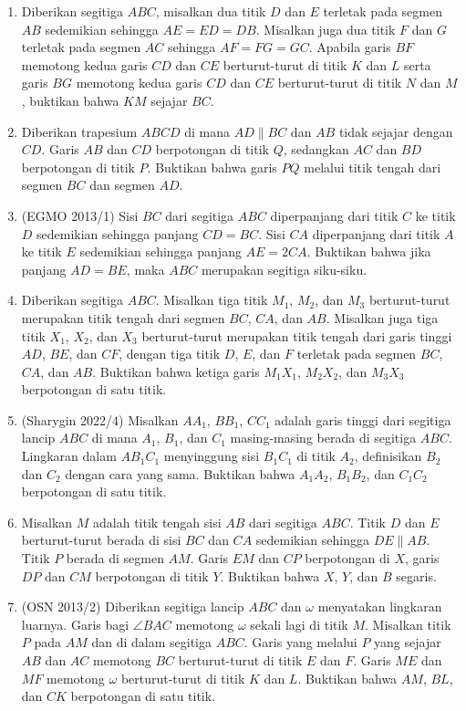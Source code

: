 \documentclass[a4paper, 11pt]{article}
\begin{document}
\begin{enumerate}
\item Diberikan segitiga $ABC$, misalkan dua titik $D$ dan $E$ terletak pada segmen $AB$ sedemikian sehingga $AE=ED=DB$. Misalkan juga dua titik $F$ dan $G$ terletak pada segmen $AC$ sehingga $AF=FG=GC$. Apabila garis $BF$ memotong kedua garis $CD$ dan $CE$ berturut-turut di titik $K$ dan $L$ serta garis $BG$ memotong kedua garis $CD$ dan $CE$ berturut-turut di titik $N$ dan $M$, buktikan bahwa $KM$ sejajar $BC$.
\item Diberikan trapesium $ABCD$ di mana $AD\parallel BC$ dan $AB$ tidak sejajar dengan $CD$. Garis $AB$ dan $CD$ berpotongan di titik $Q$, sedangkan $AC$ dan $BD$ berpotongan di titik $P$. Buktikan bahwa garis $PQ$ melalui titik tengah dari segmen $BC$ dan segmen $AD$.
\item (EGMO 2013/1) Sisi $BC$ dari segitiga $ABC$ diperpanjang dari titik $C$ ke titik $D$ sedemikian sehingga panjang $CD=BC$. Sisi $CA$ diperpanjang dari titik $A$ ke titik $E$ sedemikian sehingga panjang $AE=2CA$. Buktikan bahwa jika panjang $AD=BE$, maka $ABC$ merupakan segitiga siku-siku.
\item Diberikan segitiga $ABC$. Misalkan tiga titik $M_1$, $M_2$, dan $M_3$ berturut-turut merupakan titik tengah dari segmen $BC$, $CA$, dan $AB$. Misalkan juga tiga titik $X_1$, $X_2$, dan $X_3$ berturut-turut merupakan titik tengah dari garis tinggi $AD$, $BE$, dan $CF$, dengan tiga titik $D$, $E$, dan $F$ terletak pada segmen $BC$, $CA$, dan $AB$. Buktikan bahwa ketiga garis $M_1X_1$, $M_2X_2$, dan $M_3X_3$ berpotongan di satu titik.
\item (Sharygin 2022/4) Misalkan $AA_1$, $BB_1$, $CC_1$ adalah garis tinggi dari segitiga lancip $ABC$ di mana $A_1$, $B_1$, dan $C_1$ masing-masing berada di segitiga $ABC$. Lingkaran dalam $AB_1C_1$ menyinggung sisi $B_1C_1$ di titik $A_2$, definisikan $B_2$ dan $C_2$ dengan cara yang sama. Buktikan bahwa $A_1A_2$, $B_1B_2$, dan $C_1C_2$ berpotongan di satu titik.
\item Misalkan $M$ adalah titik tengah sisi $AB$ dari segitiga $ABC$. Titik $D$ dan $E$ berturut-turut berada di sisi $BC$ dan $CA$ sedemikian sehingga $DE\parallel AB$. Titik $P$ berada di segmen $AM$. Garis $EM$ dan $CP$ berpotongan di $X$, garis $DP$ dan $CM$ berpotongan di titik $Y$. Buktikan bahwa $X$, $Y$, dan $B$ segaris.
\item (OSN 2013/2) Diberikan segitiga lancip $ABC$ dan $\omega$ menyatakan lingkaran luarnya. Garis bagi $\angle BAC$ memotong $\omega$ sekali lagi di titik $M$. Misalkan titik $P$ pada $AM$ dan di dalam segitiga $ABC$. Garis yang melalui $P$ yang sejajar $AB$ dan $AC$ memotong $BC$ berturut-turut di titik $E$ dan $F$. Garis $ME$ dan $MF$ memotong $\omega$ berturut-turut di titik $K$ dan $L$. Buktikan bahwa $AM$, $BL$, dan $CK$ berpotongan di satu titik.

\end{enumerate}
\end{document}
